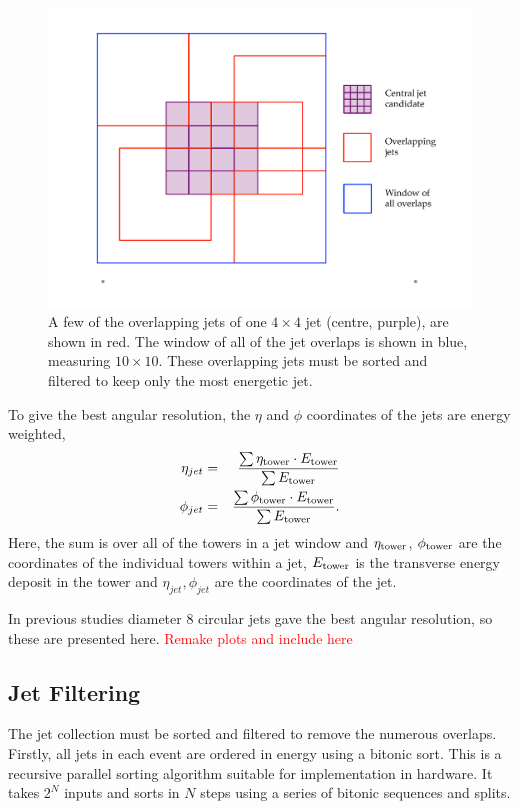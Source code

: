 \begin{figure}[ht!]
\begin{center}
  \includegraphics[scale=0.37]{Figures/l1jets/jetoverlaps}
\caption{A few of the overlapping jets of one $4\times4$ jet (centre, purple), are shown in red. The window of all of the jet overlaps is shown in blue, measuring $10\times10$. These overlapping jets must be sorted and filtered to keep only the most energetic jet.}
\label{slide}
\end{center}
\end{figure}

To give the best angular resolution, the $\eta$ and $\phi$ coordinates of the jets are energy weighted,
\begin{eqnarray}
\eta_{jet} &=& \frac{\sum{\eta_{\rm tower} \cdot E_{\rm tower}} } {\sum{ E_{\rm tower} } }  \\
\phi_{jet} &=& \frac{\sum{\phi_{\rm tower} \cdot E_{\rm tower}} } {\sum{ E_{\rm tower} } } . 
\end{eqnarray}
Here, the sum is over all of the towers in a jet window and $\eta_{\rm tower}$, $\phi_{\rm tower}$ are the coordinates of the individual towers within a jet, $E_{\rm tower}$ is the transverse energy deposit in the tower and $\eta_{jet}, \phi_{jet}$ are the coordinates of the jet.


In previous studies diameter 8 circular jets gave the best angular resolution, so these are presented here. 
\textcolor{red}{Remake plots and include here}



\subsection{Jet Filtering} 
The jet collection must be sorted and filtered to remove the numerous overlaps.
Firstly, all jets in each event are ordered in energy using a bitonic sort.
This is a recursive parallel sorting algorithm suitable for implementation in hardware.
It takes $2^N$ inputs and sorts in $N$ steps using a series of bitonic sequences and splits.

